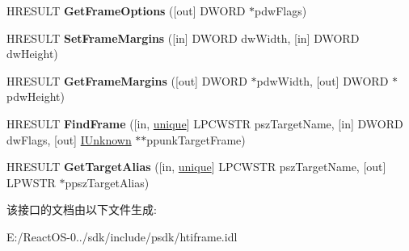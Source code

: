 \begin{DoxyCompactItemize}
H\+R\+E\+S\+U\+LT {\bfseries Get\+Frame\+Options} (\mbox{[}out\mbox{]} D\+W\+O\+RD $\ast$pdw\+Flags)
\item 
\mbox{\label{interface_i_target_frame2_a04ff77d2e08074c0357afa5da9ca276e}} 
H\+R\+E\+S\+U\+LT {\bfseries Set\+Frame\+Margins} (\mbox{[}in\mbox{]} D\+W\+O\+RD dw\+Width, \mbox{[}in\mbox{]} D\+W\+O\+RD dw\+Height)
\item 
\mbox{\label{interface_i_target_frame2_a5a2e20ba87a36c5802144937177d4b61}} 
H\+R\+E\+S\+U\+LT {\bfseries Get\+Frame\+Margins} (\mbox{[}out\mbox{]} D\+W\+O\+RD $\ast$pdw\+Width, \mbox{[}out\mbox{]} D\+W\+O\+RD $\ast$pdw\+Height)
\item 
\mbox{\label{interface_i_target_frame2_aa21832528dcdbe46bc5f581679e2ad76}} 
H\+R\+E\+S\+U\+LT {\bfseries Find\+Frame} (\mbox{[}in, \hyperlink{interfaceunique}{unique}\mbox{]} L\+P\+C\+W\+S\+TR psz\+Target\+Name, \mbox{[}in\mbox{]} D\+W\+O\+RD dw\+Flags, \mbox{[}out\mbox{]} \hyperlink{interface_i_unknown}{I\+Unknown} $\ast$$\ast$ppunk\+Target\+Frame)
\item 
\mbox{\label{interface_i_target_frame2_ae03b55f065b37202d994298144f31692}} 
H\+R\+E\+S\+U\+LT {\bfseries Get\+Target\+Alias} (\mbox{[}in, \hyperlink{interfaceunique}{unique}\mbox{]} L\+P\+C\+W\+S\+TR psz\+Target\+Name, \mbox{[}out\mbox{]} L\+P\+W\+S\+TR $\ast$ppsz\+Target\+Alias)
\end{DoxyCompactItemize}


该接口的文档由以下文件生成\+:\begin{DoxyCompactItemize}
\item 
E\+:/\+React\+O\+S-\/0../sdk/include/psdk/htiframe.\+idl\end{DoxyCompactItemize}
